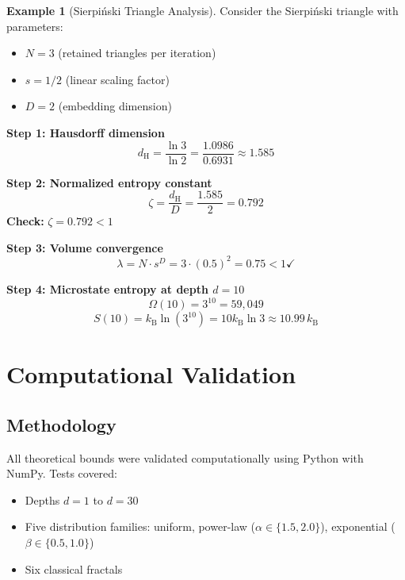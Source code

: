 \documentclass[11pt,a4paper]{article}
\theoremstyle{definition}
\newtheorem{example}[theorem]{Example}
\theoremstyle{remark}
\newcommand{\kB}{k_{\mathrm{B}}}
\newcommand{\dH}{d_{\mathrm{H}}}
\begin{document}
\begin{example}[Sierpi\'nski Triangle Analysis]
\label{ex:sierpinski}
Consider the Sierpi\'nski triangle with parameters:
\begin{itemize}[nosep]
    \item $N = 3$ (retained triangles per iteration)
    \item $s = 1/2$ (linear scaling factor)
    \item $D = 2$ (embedding dimension)
\end{itemize}

\textbf{Step 1: Hausdorff dimension}
\begin{equation}
    \dH = \frac{\ln 3}{\ln 2} = \frac{1.0986}{0.6931} \approx 1.585
\end{equation}

\textbf{Step 2: Normalized entropy constant}
\begin{equation}
    \zeta = \frac{\dH}{D} = \frac{1.585}{2} = 0.792
\end{equation}
\textbf{Check:} $\zeta = 0.792 < 1$ \checkmark

\textbf{Step 3: Volume convergence}
\begin{equation}
    \lambda = N \cdot s^D = 3 \cdot (0.5)^2 = 0.75 < 1 \checkmark
\end{equation}

\textbf{Step 4: Microstate entropy at depth $d = 10$}
\begin{equation}
    \Omega(10) = 3^{10} = 59,049
\end{equation}
\begin{equation}
    S(10) = \kB \ln(3^{10}) = 10 \kB \ln 3 \approx 10.99 \, \kB
\end{equation}
\end{example}

\section{Computational Validation}
\label{sec:validation}

\subsection{Methodology}

All theoretical bounds were validated computationally using Python with NumPy. Tests covered:
\begin{itemize}[nosep]
    \item Depths $d = 1$ to $d = 30$
    \item Five distribution families: uniform, power-law ($\alpha \in \{1.5, 2.0\}$), exponential ($\beta \in \{0.5, 1.0\}$)
    \item Six classical fractals
\end{itemize}
\end{document}
